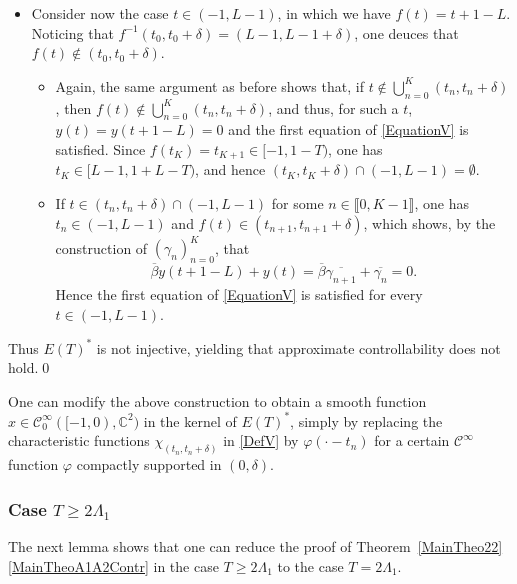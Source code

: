 \begin{itemize}
\item
Consider now the case $t \in (-1, L - 1)$, in which we have $f(t) = t + 1 - L$.
Noticing that $f^{-1}(t_0, t_0 + \delta) = (L-1, L-1+\delta)$, one deuces that \hbox{$f(t) \notin (t_0, t_0 + \delta)$}.
\begin{itemize}
\item
Again, the same argument as before shows that, if $t \notin \bigcup_{n=0}^K (t_n, t_n + \delta)$, then \hbox{$f(t) \notin \bigcup_{n=0}^K (t_n, t_n + \delta)$}, and thus, for such a $t$, $y(t) = y(t + 1 - L) = 0$ and the first equation of \eqref{EquationV} is satisfied. Since $f(t_K) = t_{K + 1} \in [-1, 1 - T)$, one has $t_K \in [L - 1, 1 + L - T)$, and hence $(t_K, t_K + \delta) \cap (-1, L-1) = \emptyset$.
\item
If $t \in (t_n, t_n + \delta) \cap (-1, L-1)$ for some $n \in \llbracket 0, K-1\rrbracket$, one has $t_n \in (-1, L-1)$ and $f(t) \in (t_{n+1}, t_{n+1} + \delta)$, which shows, by the construction of $(\gamma_n)_{n=0}^K$, that
\[
\overline\beta y(t + 1 - L) + y(t) = \overline\beta \overline{\gamma_{n+1}} + \overline{\gamma_{n}} = 0.
\]
Hence the first equation of \eqref{EquationV} is satisfied for every $t \in (-1, L - 1)$.
\end{itemize}
\end{itemize}

Thus $E(T)^\ast$ is not injective, yielding that approximate controllability does not hold.\qed

\begin{remk}
One can modify the above construction to obtain a smooth function $x \in \mathcal C^\infty_0([-1, 0), \mathbb C^2)$ in the kernel of $E(T)^\ast$, simply by replacing the characteristic functions $\chi_{(t_n, t_n + \delta)}$ in \eqref{DefV} by $\varphi(\cdot - t_n)$ for a certain $\mathcal C^\infty$ function $\varphi$ compactly supported in $(0, \delta)$.
\end{remk}

\subsubsection{\texorpdfstring{Case $T \geq 2 \Lambda_1$}{Case T >= 2 Lambda1}}

The next lemma shows that one can reduce the proof of Theorem~\ref{MainTheo22}\eqref{MainTheoA1A2Contr} in the case $T \geq 2 \Lambda_1$ to the case $T = 2 \Lambda_1$.

